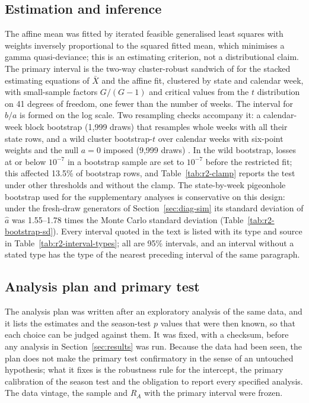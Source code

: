 

\subsection{Estimation and inference}
\label{sec:diag-estimation}

The affine mean was fitted by iterated feasible generalised least squares with weights inversely proportional to the squared fitted mean, which minimises a gamma quasi-deviance; this is an estimating criterion, not a distributional claim. The primary interval is the two-way cluster-robust sandwich of \citet{cameron2011robust} for the stacked estimating equations of $\bar X$ and the affine fit, clustered by state and calendar week, with small-sample factors $G/(G-1)$ and critical values from the $t$ distribution on 41 degrees of freedom, one fewer than the number of weeks. The interval for $b/a$ is formed on the log scale. Two resampling checks accompany it: a calendar-week block bootstrap (1,999 draws) that resamples whole weeks with all their state rows, and a wild cluster bootstrap-$t$ over calendar weeks with six-point weights and the null $a=0$ imposed (9,999 draws) \citep{cameron2008bootstrap, webb2023reworking}. In the wild bootstrap, losses at or below $10^{-7}$ in a bootstrap sample are set to $10^{-7}$ before the restricted fit; this affected 13.5\% of bootstrap rows, and Table~\ref{tab:r2-clamp} reports the test under other thresholds and without the clamp. The state-by-week pigeonhole bootstrap \citep{owen2007pigeonhole} used for the supplementary analyses is conservative on this design: under the fresh-draw generators of Section~\ref{sec:diag-sim} its standard deviation of $\hat a$ was 1.55--1.78 times the Monte Carlo standard deviation (Table~\ref{tab:r2-bootstrap-sd}). Every interval quoted in the text is listed with its type and source in Table~\ref{tab:r2-interval-types}; all are 95\% intervals, and an interval without a stated type has the type of the nearest preceding interval of the same paragraph.

\subsection{Analysis plan and primary test}
\label{sec:diag-plan}

The analysis plan was written after an exploratory analysis of the same data, and it lists the estimates and the season-test $p$ values that were then known, so that each choice can be judged against them. It was fixed, with a checksum, before any analysis in Section~\ref{sec:results} was run. Because the data had been seen, the plan does not make the primary test confirmatory in the sense of an untouched hypothesis; what it fixes is the robustness rule for the intercept, the primary calibration of the season test and the obligation to report every specified analysis. The data vintage, the sample and $R_A$ with the primary interval were frozen.

